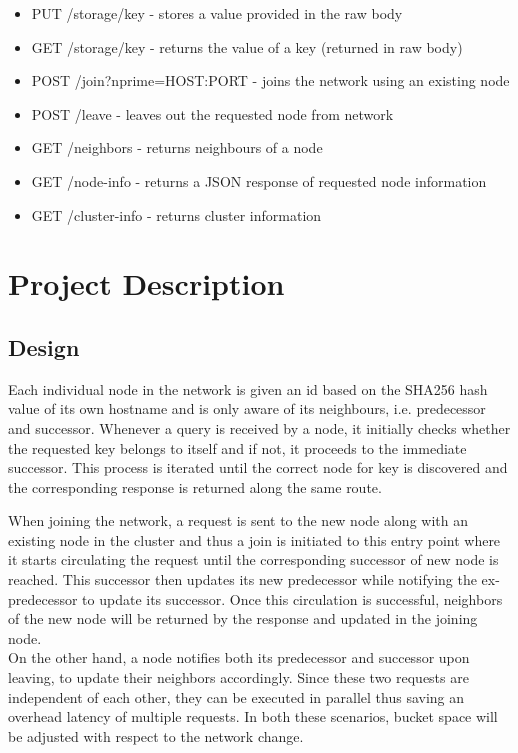 \documentclass[
    a4paper,
    twocolumn,
]{article}
\begin{document}
\begin{itemize}
	\item PUT /storage/key - stores a value provided in the raw body
	\item GET /storage/key - returns the value of a key (returned in raw body)
	\item POST /join?nprime=HOST:PORT - joins the network using an existing node
	\item POST /leave - leaves out the requested node from network
	\item GET /neighbors - returns neighbours of a node
	\item GET /node-info - returns a JSON response of requested node information
	\item GET /cluster-info - returns cluster information
\end{itemize}

\section{Project Description}
\subsection{Design}

Each individual node in the network is given an id based on the SHA256 hash value of its own hostname and is only aware of its neighbours, i.e. predecessor and successor. Whenever a query is received by a node, it initially checks whether the requested key belongs to itself and if not, it proceeds to the immediate successor. This process is iterated until the correct node for key is discovered and the corresponding response is returned along the same route.

When joining the network, a request is sent to the new node along with an existing node in the cluster and thus a join is initiated to this entry point where it starts circulating the request until the corresponding successor of new node is reached. This successor then updates its new predecessor while notifying the ex-predecessor to update its successor. Once this circulation is successful, neighbors of the new node will be returned by the response and updated in the joining node.\\

On the other hand, a node notifies both its predecessor and successor upon leaving, to update their neighbors accordingly. Since these two requests are independent of each other, they can be executed in parallel thus saving an overhead latency of multiple requests. In both these scenarios, bucket space will be adjusted with respect to the network change. \\
\end{document}

